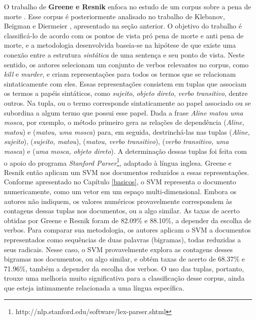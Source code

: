 O trabalho de \textbf{Greene e Resnik} enfoca no estudo de um corpus sobre a pena de morte \cite{greene}. Esse corpus é posteriormente analisado no trabalho de Klebanov, Beigman e Diermeier \cite{klebanov}, apresentado na seção anterior. O objetivo do trabalho é classificá-lo de acordo com os pontos de vista pró pena de morte e anti pena de morte, e a metodologia desenvolvida baseia-se na hipótese de que existe uma conexão entre a estrutura \emph{sintática} de uma sentença e seu ponto de vista. Neste sentido, os autores selecionam um conjunto de verbos relevantes no corpus, como \emph{kill} e \emph{murder}, e criam representações para todos os termos que se relacionam sintaticamente com eles. Essas representações consistem em tuplas que associam os termos a papéis sintáticos, como \emph{sujeito}, \emph{objeto direto}, \emph{verbo transitivo}, dentre outros. Na tupla, ou o termo corresponde sintaticamente ao papel associado ou se subordina a algum termo que possui esse papel. Dada a frase \emph{Aline matou uma mosca}, por exemplo, o método primeiro gera as relações de dependência (\emph{Aline, matou}) e (\emph{matou, uma mosca}) para, em seguida, destrinchá-las nas tuplas (\emph{Aline, sujeito}), (\emph{sujeito, matou}), (\emph{matou, verbo transitivo}), (\emph{verbo transitivo, uma mosca}) e (\emph{uma mosca, objeto direto}). A determinação dessas tuplas foi feita com o apoio do programa \emph{Stanford Parser}\footnote{http://nlp.stanford.edu/software/lex-parser.shtml}, adaptado à língua inglesa. Greene e Resnik então aplicam um SVM nos documentos reduzidos a essas representações. Conforme apresentado no Capítulo \ref{basicos}, o SVM representa o documento numericamente, como um vetor em um espaço multi-dimensional. Embora os autores não indiquem, os valores numéricos provavelmente correspondem às contagens dessas tuplas nos documentos, ou a algo similar. As taxas de acerto obtidas por Greene e Resnik foram de 82.09\% e 88.10\%, a depender da escolha de verbos. Para comparar sua metodologia, os autores aplicam o SVM a documentos representados como sequências de duas palavras (bigramas), todas reduzidas a seus radicais. Nesse caso, o SVM provavelmente explora as contagens desses bigramas nos documentos, ou algo similar, e obtém taxas de acerto de 68.37\% e 71.96\%, também a depender da escolha dos verbos. O uso das tuplas, portanto, trouxe uma melhoria muito significativa para a classificação desse corpus, ainda que esteja intimamente relacionada a uma língua específica.

